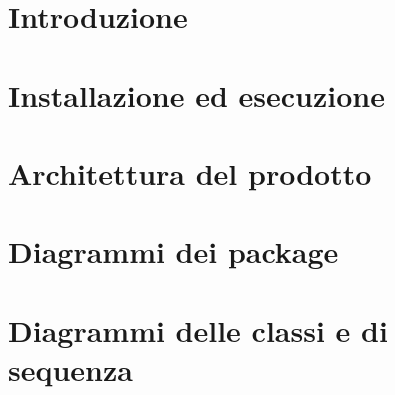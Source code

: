\documentclass[a4paper, oneside, openany, dvipsnames, table]{article}
\begin{document}
\copertina{} 

\newpage
\tableofcontents
\newpage
\listoffigures
\newpage
\listoftables
\newpage

\section{Introduzione}

\newpage
\section{Installazione ed esecuzione}

\newpage
\section{Architettura del prodotto}

\newpage
\section{Diagrammi dei package}

\newpage
\section{Diagrammi delle classi e di sequenza}

\end{document}
